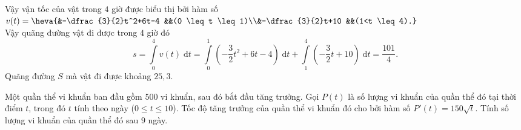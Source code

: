 \begin{ex}
{		Vậy vận tốc của vật trong $4$ giờ được biểu thị bởi hàm số $v(t)=\heva{&-\dfrac{3}{2}t^2+6t-4 &&(0 \leq t \leq 1)\\&-\dfrac{3}{2}t+10 &&(1<t \leq 4).}$\\
		Vậy quãng đường vật đi được trong $4$ giờ đó $$s=\displaystyle\int\limits_{0}^{4}v(t)\;\mathrm{d}t=\displaystyle\int\limits_{0}^{1}\left(-\dfrac{3}{2}t^2+6t-4\right)\;\mathrm{d}t+\displaystyle\int\limits_{1}^{4}\left(-\dfrac{3}{2}t+10\right)\;\mathrm{d}t=\dfrac{101}{4}.$$
		Quãng đường $S$ mà vật đi được khoảng $25,3$.
	}
\end{ex}

\begin{ex}%
	Một quần thể vi khuẩn ban đầu gồm $500$ vi khuẩn, sau đó bắt đầu tăng trưởng. Gọi $P(t)$ là số lượng vi khuẩn của quần thể đó tại thời điểm $t$, trong đó $t$ tính theo ngày ($0 \le t \le 10$). Tốc độ tăng trưởng của quần thể vi khuẩn đó cho bởi hàm số $P'(t) = 150 \sqrt{t}$. Tính số lượng vi khuẩn của quần thể đó sau $9$ ngày.
\end{ex}

